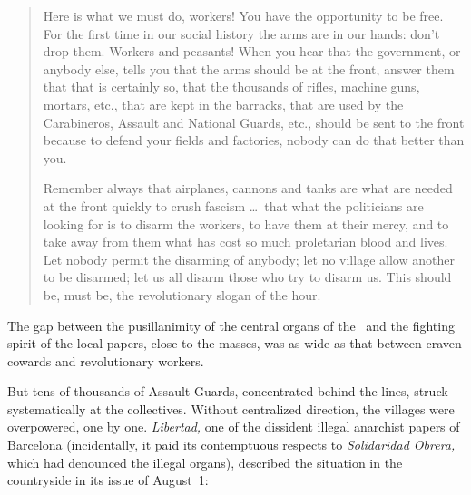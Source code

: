\begin{quotation}
  Here is what we must do, workers! You have the opportunity to be free. For the first time in our social history the arms are in our hands: don’t drop them. Workers and peasants! When you hear that the government, or anybody else, tells you that the arms should be at the front, answer them that that is certainly so, that the thousands of rifles, machine guns, mortars, etc., that are kept in the barracks, that are used by the Carabineros, Assault and National Guards, etc., should be sent to the front because to defend your fields and factories, nobody can do that better than you.
  
  Remember always that airplanes, cannons and tanks are what are needed at the front quickly to crush fascism \dots\ that what the politicians are looking for is to disarm the workers, to have them at their mercy, and to take away from them what has cost so much proletarian blood and lives. Let nobody permit the disarming of anybody; let no village allow another to be disarmed; let us all disarm those who try to disarm us. This should be, must be, the revolutionary slogan of the hour.
\end{quotation}

The gap between the pusillanimity of the central organs of the \CNT\ and the fighting spirit of the local papers, close to the masses, was as wide as that between craven cowards and revolutionary workers.

But tens of thousands of Assault Guards, concentrated behind the lines, struck systematically at the collectives. Without centralized direction, the villages were overpowered, one by one. \emph{Libertad,} one of the dissident illegal anarchist papers of Barcelona (incidentally, it paid its contemptuous respects to \emph{Solidaridad Obrera,} which had denounced the illegal organs), described the situation in the countryside in its issue of August~1:

